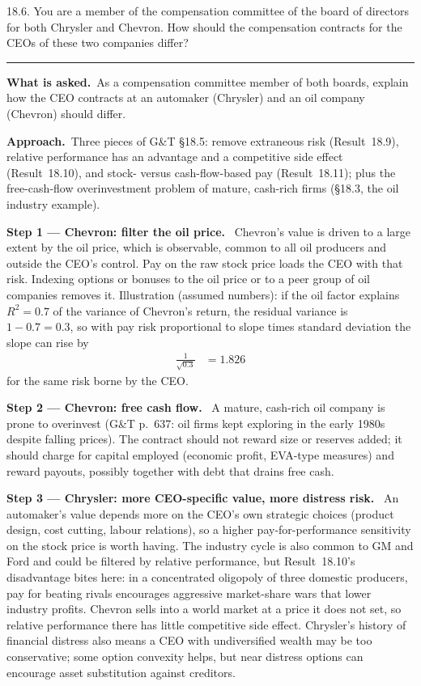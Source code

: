 \documentclass[11pt,a4paper]{article}
\newcommand{\step}[2]{\par\medskip\noindent\textbf{Step #1 --- #2.}~}
\newcommand{\asked}{\par\medskip\noindent\textbf{What is asked.}~}
\newcommand{\approach}{\par\smallskip\noindent\textbf{Approach.}~}
\newcommand{\stmtend}{\par\endgroup\nopagebreak\noindent\rule{\linewidth}{0.4pt}\par\medskip}
\begin{document}
18.6. You are a member of the compensation committee of the board of directors for both Chrysler and
Chevron. How should the compensation contracts for the CEOs of these two companies differ?
\stmtend

\asked As a compensation committee member of both boards, explain how the CEO contracts at an automaker (Chrysler) and an oil company (Chevron) should differ.

\approach Three pieces of G\&T \S18.5: remove extraneous risk (Result~18.9), relative performance has an advantage and a competitive side effect (Result~18.10), and stock- versus cash-flow-based pay (Result~18.11); plus the free-cash-flow overinvestment problem of mature, cash-rich firms (\S18.3, the oil industry example).

\step{1}{Chevron: filter the oil price} Chevron's value is driven to a large extent by the oil price, which is observable, common to all oil producers and outside the CEO's control. Pay on the raw stock price loads the CEO with that risk. Indexing options or bonuses to the oil price or to a peer group of oil companies removes it. Illustration (assumed numbers): if the oil factor explains $R^2=0.7$ of the variance of Chevron's return, the residual variance is $1-0.7=0.3$, so with pay risk proportional to slope times standard deviation the slope can rise by
\begin{align}
  \frac{1}{\sqrt{0.3}} &= 1.826 \label{r8be7-slope}
\end{align}
for the same risk borne by the CEO.

\step{2}{Chevron: free cash flow} A mature, cash-rich oil company is prone to overinvest (G\&T p.~637: oil firms kept exploring in the early 1980s despite falling prices). The contract should not reward size or reserves added; it should charge for capital employed (economic profit, EVA-type measures) and reward payouts, possibly together with debt that drains free cash.

\step{3}{Chrysler: more CEO-specific value, more distress risk} An automaker's value depends more on the CEO's own strategic choices (product design, cost cutting, labour relations), so a higher pay-for-performance sensitivity on the stock price is worth having. The industry cycle is also common to GM and Ford and could be filtered by relative performance, but Result~18.10's disadvantage bites here: in a concentrated oligopoly of three domestic producers, pay for beating rivals encourages aggressive market-share wars that lower industry profits. Chevron sells into a world market at a price it does not set, so relative performance there has little competitive side effect. Chrysler's history of financial distress also means a CEO with undiversified wealth may be too conservative; some option convexity helps, but near distress options can encourage asset substitution against creditors.
\end{document}
